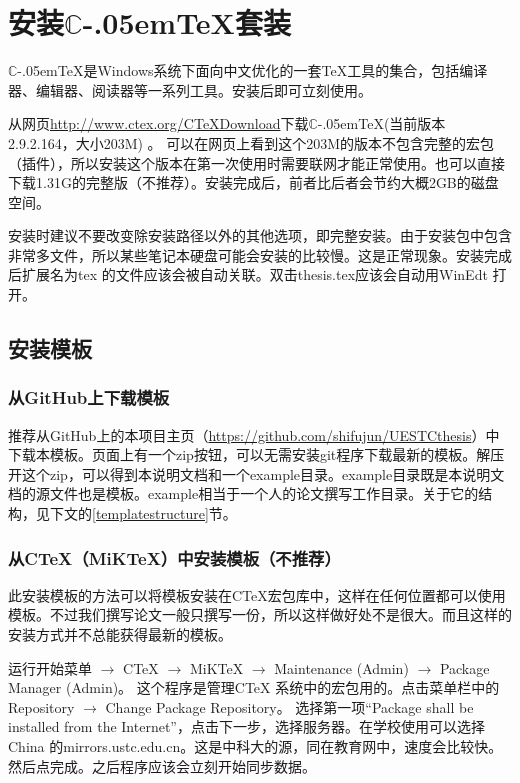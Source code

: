 \section{安装$\mathbb{C}$\kern-.05em\TeX{}套装}
$\mathbb{C}$\kern-.05em\TeX{}是Windows系统下面向中文优化的一套\TeX{}工具的集合，包括编译器、编辑器、阅读器等一系列工具。安装后即可立刻使用。

从网页\url{http://www.ctex.org/CTeXDownload}下载$\mathbb{C}$\kern-.05em\TeX{}(当前版本2.9.2.164，大小203M) 。 可以在网页上看到这个203M的版本不包含完整的宏包（插件），所以安装这个版本在第一次使用时需要联网才能正常使用。也可以直接下载1.31G的完整版（不推荐）。安装完成后，前者比后者会节约大概2GB的磁盘空间。

安装时建议不要改变除安装路径以外的其他选项，即完整安装。由于安装包中包含非常多文件，所以某些笔记本硬盘可能会安装的比较慢。这是正常现象。安装完成后扩展名为tex 的文件应该会被自动关联。双击thesis.tex应该会自动用WinEdt 打开。
\subsection{安装模板}
\subsubsection{从GitHub上下载模板}
推荐从GitHub上的本项目主页（\url{https://github.com/shifujun/UESTCthesis}）中下载本模板。页面上有一个zip按钮，可以无需安装git程序下载最新的模板。解压开这个zip，可以得到本说明文档和一个example目录。example目录既是本说明文档的源文件也是模板。example相当于一个人的论文撰写工作目录。关于它的结构，见下文的\ref{templatestructure}节。
\subsubsection{从CTeX（MiKTeX）中安装模板（不推荐）}
此安装模板的方法可以将模板安装在CTeX宏包库中，这样在任何位置都可以使用模板。不过我们撰写论文一般只撰写一份，所以这样做好处不是很大。而且这样的安装方式并不总能获得最新的模板。

运行开始菜单 $\longrightarrow$ CTeX $\longrightarrow$ MiKTeX $\longrightarrow$ Maintenance (Admin) $\longrightarrow$ Package Manager (Admin)。 这个程序是管理CTeX 系统中的宏包用的。点击菜单栏中的Repository $\longrightarrow$ Change Package Repository。 选择第一项“Package shall be installed from the Internet”，点击下一步，选择服务器。在学校使用可以选择China 的mirrors.ustc.edu.cn。这是中科大的源，同在教育网中，速度会比较快。然后点完成。之后程序应该会立刻开始同步数据。

